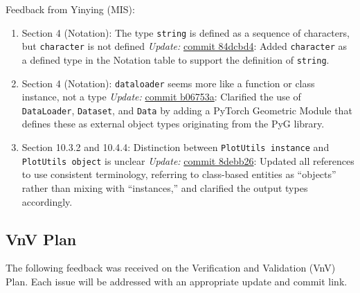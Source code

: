 \documentclass{article}
\begin{document}
Feedback from Yinying (MIS):
\begin{enumerate}
    \item Section 4 (Notation): The type \texttt{string} is defined as a sequence of characters, but \texttt{character} is not defined  
    \newline \textit{Update:} \href{https://github.com/Yuanqi-X/Re-ProtGNN/commit/84dcbd4eabf06aee7ffdc28fa216cd3c709e1319}{commit 84dcbd4}: Added \texttt{character} as a defined type in the Notation table to support the definition of \texttt{string}.

    \item Section 4 (Notation): \texttt{dataloader} seems more like a function or class instance, not a type  
    \newline \textit{Update:} \href{https://github.com/Yuanqi-X/Re-ProtGNN/commit/b06753aafd3dde80b4ffe4beaeaf41ffb161120a}{commit b06753a}: Clarified the use of \texttt{DataLoader}, \texttt{Dataset}, and \texttt{Data} by adding a PyTorch Geometric Module that defines these as external object types originating from the PyG library.

    \item Section 10.3.2 and 10.4.4: Distinction between \texttt{PlotUtils instance} and \texttt{PlotUtils object} is unclear  
    \newline \textit{Update:} \href{https://github.com/Yuanqi-X/Re-ProtGNN/commit/8debb26d964d72f62ae948cf14a9c546b37195d2}{commit 8debb26}: Updated all references to use consistent terminology, referring to class-based entities as “objects” rather than mixing with “instances,” and clarified the output types accordingly.
\end{enumerate}



\subsection{VnV Plan}

The following feedback was received on the Verification and Validation (VnV) Plan. Each issue will be addressed with an appropriate update and commit link.
\end{document}
